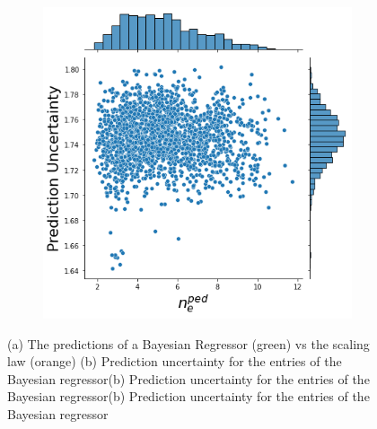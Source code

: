 \documentclass[a4paper, twoside, final, 12pt]{article}
\begin{document}
{\begin{figure}
\begin{subfigure}{0.495\linewidth}
		\includegraphics[scale=0.5]{./src/Baysian_regression_uncert}
		\caption{}
		\label{subfig:bayesian_uq}
	\end{subfigure}\hfill
	\caption{(a) The predictions of a Bayesian Regressor (green) vs the scaling law (orange) (b) Prediction uncertainty for the entries of the Bayesian regressor(b) Prediction uncertainty for the entries of the Bayesian regressor(b) Prediction uncertainty for the entries of the Bayesian regressor}
	\label{fig:lin_reg}
\end{figure}

}
\end{document}
